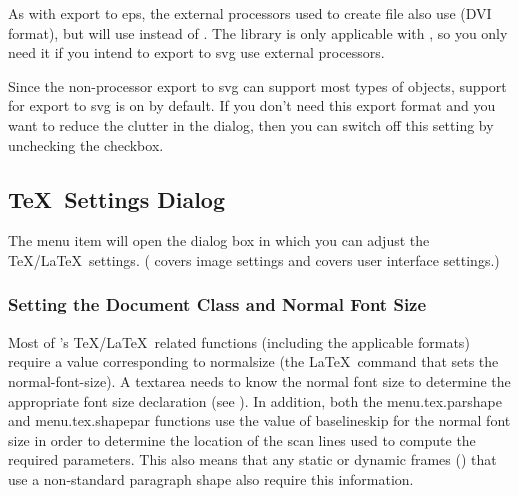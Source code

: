 
As with export to \gls{eps}, the external processors used to create
 file also use  (DVI format),
but will use  instead of . The  library is only
applicable with , so you only need it if you intend to
export to \gls{svg} use external processors.

Since the non-processor export to \gls{svg} can support most types of
\glspl{object}, support for export to \gls{svg} is on by default.
If you don't need this export format and you want to reduce the
clutter in the  dialog, then you can switch off this
setting by unchecking the  checkbox.


\subsection{\TeX\ Settings Dialog}\label{sec:texconfig}


The  menu item will open 
the  dialog box
in which you can adjust the \TeX\slash\LaTeX\ settings.
( covers image settings
and  covers user interface settings.)


\subsubsection{Setting the Document Class and Normal Font Size}
\label{sec:normalsize}


Most of \FlowframTk's \TeX\slash\LaTeX\ related functions (including the
applicable  formats) require a value
corresponding to \gls{normalsize} (the \LaTeX\ command that sets the
\gls{normal-font-size}). A \gls{textarea} needs to know the normal
font size to determine the appropriate font size declaration (see
). In addition, both the
\gls{menu.tex.parshape} and \gls{menu.tex.shapepar} functions use
the value of \gls{baselineskip} for the normal font size in order to
determine the location of the scan lines used to compute the
required parameters. This also means that any static or dynamic
frames () that use a non-standard paragraph
shape also require this information.

